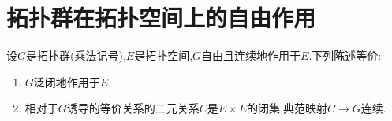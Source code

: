 \section{拓扑群在拓扑空间上的自由作用}

\begin{proposition}{}{}
	设$G$是拓扑群(乘法记号),$E$是拓扑空间,$G$自由且连续地作用于$E$.下列陈述等价:
	\begin{enumerate}
		\item $G$泛闭地作用于$E$.
		\item 相对于$G$诱导的等价关系的二元关系$C$是$E\times E$的闭集,典范映射$C\to G$连续.
	\end{enumerate}
\end{proposition}

